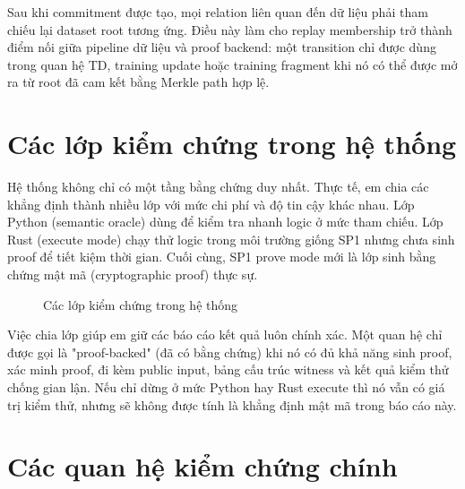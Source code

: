 \documentclass[12pt,a4paper,oneside]{report}
\begin{document}
Sau khi commitment được tạo, mọi relation liên quan đến dữ liệu phải tham chiếu lại dataset root tương ứng. Điều này làm cho replay membership trở thành điểm nối giữa pipeline dữ liệu và proof backend: một transition chỉ được dùng trong quan hệ TD, training update hoặc training fragment khi nó có thể được mở ra từ root đã cam kết bằng Merkle path hợp lệ.

\section{Các lớp kiểm chứng trong hệ thống}

Hệ thống không chỉ có một tầng bằng chứng duy nhất. Thực tế, em chia các khẳng định thành nhiều lớp với mức chi phí và độ tin cậy khác nhau. Lớp Python (semantic oracle) dùng để kiểm tra nhanh logic ở mức tham chiếu. Lớp Rust (execute mode) chạy thử logic trong môi trường giống SP1 nhưng chưa sinh proof để tiết kiệm thời gian. Cuối cùng, SP1 prove mode mới là lớp sinh bằng chứng mật mã (cryptographic proof) thực sự.

\begin{figure}[H]
\centering
{}
\caption{Các lớp kiểm chứng trong hệ thống}
\end{figure}

Việc chia lớp giúp em giữ các báo cáo kết quả luôn chính xác. Một quan hệ chỉ được gọi là "proof-backed" (đã có bằng chứng) khi nó có đủ khả năng sinh proof, xác minh proof, đi kèm public input, bảng cấu trúc witness và kết quả kiểm thử chống gian lận. Nếu chỉ dừng ở mức Python hay Rust execute thì nó vẫn có giá trị kiểm thử, nhưng sẽ không được tính là khẳng định mật mã trong báo cáo này.

\section{Các quan hệ kiểm chứng chính}
\end{document}
